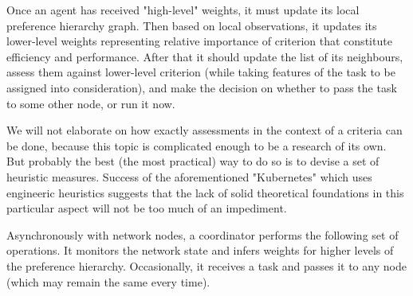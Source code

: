 Once an agent has received "high-level" weights, it must update its local preference hierarchy graph.
Then based on local observations, it updates its lower-level weights representing relative importance of criterion that constitute efficiency and performance.
After that it should update the list of its neighbours, assess them against lower-level criterion (while taking features of the task to be assigned into consideration), and make the decision on whether to pass the task to some other node, or run it now.

We will not elaborate on how exactly assessments in the context of a criteria can be done, because this topic is complicated enough to be a research of its own.
But probably the best (the most practical) way to do so is to devise a set of heuristic measures.
Success of the aforementioned "Kubernetes" which uses engineeric heuristics suggests that the lack of solid theoretical foundations in this particular aspect will not be too much of an impediment.

Asynchronously with network nodes, a coordinator performs the following set of operations. It monitors the network state and infers weights for higher levels of the preference hierarchy. Occasionally, it receives a task and passes it to any node (which may remain the same every time).
